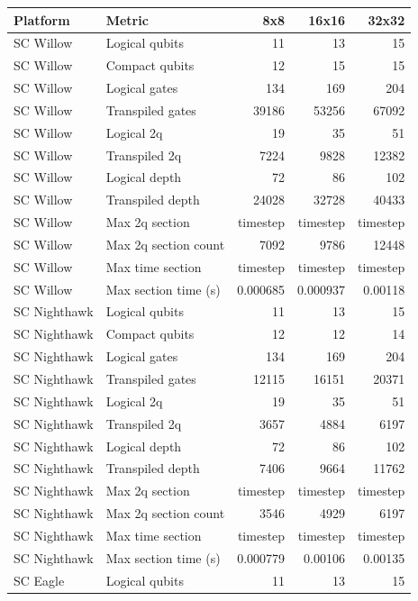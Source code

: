 \begin{table}
\centering
\scriptsize
\begin{tabular}{llrrr}
\hline
Platform & Metric & 8x8 & 16x16 & 32x32 \\
\hline
SC Willow & Logical qubits & 11 & 13 & 15 \\
SC Willow & Compact qubits & 12 & 15 & 15 \\
SC Willow & Logical gates & 134 & 169 & 204 \\
SC Willow & Transpiled gates & 39186 & 53256 & 67092 \\
SC Willow & Logical 2q & 19 & 35 & 51 \\
SC Willow & Transpiled 2q & 7224 & 9828 & 12382 \\
SC Willow & Logical depth & 72 & 86 & 102 \\
SC Willow & Transpiled depth & 24028 & 32728 & 40433 \\
SC Willow & Max 2q section & timestep & timestep & timestep \\
SC Willow & Max 2q section count & 7092 & 9786 & 12448 \\
SC Willow & Max time section & timestep & timestep & timestep \\
SC Willow & Max section time (s) & 0.000685 & 0.000937 & 0.00118 \\
\hline
SC Nighthawk & Logical qubits & 11 & 13 & 15 \\
SC Nighthawk & Compact qubits & 12 & 12 & 14 \\
SC Nighthawk & Logical gates & 134 & 169 & 204 \\
SC Nighthawk & Transpiled gates & 12115 & 16151 & 20371 \\
SC Nighthawk & Logical 2q & 19 & 35 & 51 \\
SC Nighthawk & Transpiled 2q & 3657 & 4884 & 6197 \\
SC Nighthawk & Logical depth & 72 & 86 & 102 \\
SC Nighthawk & Transpiled depth & 7406 & 9664 & 11762 \\
SC Nighthawk & Max 2q section & timestep & timestep & timestep \\
SC Nighthawk & Max 2q section count & 3546 & 4929 & 6197 \\
SC Nighthawk & Max time section & timestep & timestep & timestep \\
SC Nighthawk & Max section time (s) & 0.000779 & 0.00106 & 0.00135 \\
\hline
SC Eagle & Logical qubits & 11 & 13 & 15 \\

\end{tabular}
\end{table}
